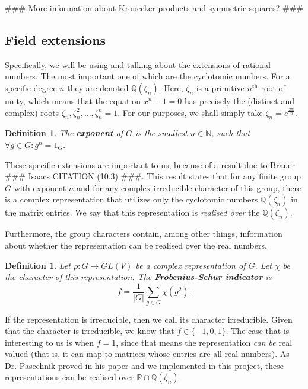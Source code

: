 \documentclass[11pt]{article}
\newtheorem{definition}[theorem]{Definition}
\begin{document}
\#\#\# More information about Kronecker products and symmetric squares? \#\#\#

\subsection{Field extensions}

Specifically, we will be using and talking about the extensions of rational numbers.
The most important one of which are the cyclotomic numbers. For a specific degree $n$ they are denoted $\mathbb{Q}(\zeta_n)$.
Here, $\zeta_n$ is a primitive $n^{\text{th}}$ root of unity, which means that the equation $x^n - 1 = 0$ has
precisely the (distinct and complex) roots $\zeta_n, \zeta_n^2, \ldots, \zeta_n^n = 1$. For our purposes, we
shall simply take $\zeta_n = e^{\frac{2\pi i}{n}}$.
\begin{definition}
  The \textbf{exponent} of $G$ is the smallest $n \in \mathbb{N}$, such that $\forall g \in G: g^n = 1_G$.
\end{definition}

These specific extensions are important to us, because of a result due to Brauer \#\#\# Isaacs CITATION (10.3) \#\#\#.
This result states that for any finite group $G$ with exponent $n$ and for any complex irreducible
character of this group, there is a complex representation that utilizes only the cyclotomic
numbers $\mathbb{Q}(\zeta_n)$ in the matrix entries.
We say that this representation is \textit{realised over} the $\mathbb{Q}(\zeta_n)$.

Furthermore, the group characters contain, among other things, information about whether the representation can
be realised over the real numbers.
\begin{definition}
  Let $\rho: G \rightarrow GL(V)$ be a complex representation of $G$. Let $\chi$ be the character
  of this representation. The \textbf{Frobenius-Schur indicator} is
  \[f = \frac{1}{\lvert G \rvert} \sum_{g \in G}\chi(g^2).\]
\end{definition}
If the representation is irreducible, then we call its character irreducible. Given that
the character is irreducible, we know that $f \in \{-1, 0, 1\}$. The case that is interesting to
us is when $f = 1$, since that means the representation \textit{can be} real valued (that is, it can map to
matrices whose entries are all real numbers). As Dr. Pasechnik proved in his paper \cite{Pas21} and we implemented in
this project, these representations can be realised over $\mathbb{R} \cap \mathbb{Q}(\zeta_n)$.
\end{document}
